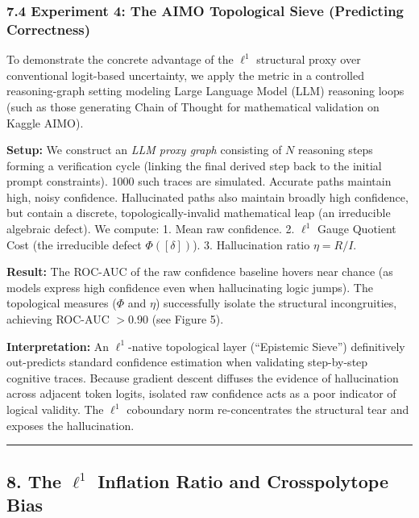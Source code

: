 \documentclass[
]{article}
\begin{document}
\subsubsection{7.4 Experiment 4: The AIMO Topological Sieve (Predicting
Correctness)}\label{experiment-4-the-aimo-topological-sieve-predicting-correctness}

To demonstrate the concrete advantage of the \(\ell^1\) structural proxy
over conventional logit-based uncertainty, we apply the metric in a
controlled reasoning-graph setting modeling Large Language Model (LLM)
reasoning loops (such as those generating Chain of Thought for
mathematical validation on Kaggle AIMO).

\textbf{Setup:} We construct an \emph{LLM proxy graph} consisting of
\(N\) reasoning steps forming a verification cycle (linking the final
derived step back to the initial prompt constraints). 1000 such traces
are simulated. Accurate paths maintain high, noisy confidence.
Hallucinated paths also maintain broadly high confidence, but contain a
discrete, topologically-invalid mathematical leap (an irreducible
algebraic defect). We compute: 1. Mean raw confidence. 2. \(\ell^1\)
Gauge Quotient Cost (the irreducible defect \(\Phi([\delta])\)). 3.
Hallucination ratio \(\eta = R / I\).

\textbf{Result:} The ROC-AUC of the raw confidence baseline hovers near
chance (as models express high confidence even when hallucinating logic
jumps). The topological measures (\(\Phi\) and \(\eta\)) successfully
isolate the structural incongruities, achieving ROC-AUC \(> 0.90\) (see
Figure 5).

\textbf{Interpretation:} An \(\ell^1\)-native topological layer
(``Epistemic Sieve'') definitively out-predicts standard confidence
estimation when validating step-by-step cognitive traces. Because
gradient descent diffuses the evidence of hallucination across adjacent
token logits, isolated raw confidence acts as a poor indicator of
logical validity. The \(\ell^1\) coboundary norm re-concentrates the
structural tear and exposes the hallucination.

\begin{center}\rule{0.5\linewidth}{0.5pt}\end{center}

\subsection{\texorpdfstring{8. The \(\ell^1\) Inflation Ratio and
Crosspolytope
Bias}{8. The \textbackslash ell\^{}1 Inflation Ratio and Crosspolytope Bias}}\label{the-ell1-inflation-ratio-and-crosspolytope-bias}
\end{document}
